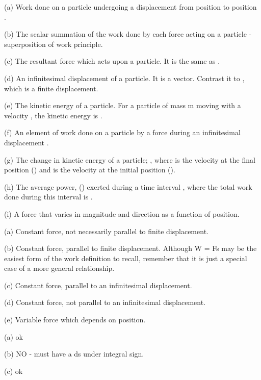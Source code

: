 {\begin{two-digit-list}
\item [50.] (a) Work done on a particle undergoing a displacement from position
            to position .
\item []   (b) The scalar summation of the work done by each force acting on a
           particle - superposition of work principle.
\item []   (c) The resultant force which acts upon a particle.
           It is the same as .
\item []   (d) An infinitesimal displacement of a particle.
           It is a vector.
           Contrast it to , which is a finite displacement.
\item []   (e) The kinetic energy of a particle.
           For a particle of mass m moving with a velocity , the kinetic
           energy is .
\item []   (f) An element of work done on a particle by a force during an
           infinitesimal displacement .
\item []   (g) The change in kinetic energy of a particle;
           , where  is the velocity at the final
           position () and  is the velocity at the initial position
           ().
\item []   (h) The average power, () exerted during a time interval ,
           where the total work done during this interval is .
\item []   (i) A force that varies in magnitude and direction as a function
           of position.
\item [51.] (a) Constant force, not necessarily parallel to finite
           displacement.
\item []   (b) Constant force, parallel to finite displacement.
           Although W = Fs may be the easiest form of the work definition to
           recall, remember that it is just a special case of a more general
           relationship.
\item []   (c) Constant force, parallel to an infinitesimal displacement.
\item []   (d) Constant force, not parallel to an infinitesimal displacement.
\item []   (e) Variable force which depends on position.
\item [52.] (a) ok
\item []   (b) NO - must have a ds under integral sign.
\item []   (c) ok

\end{two-digit-list}}
